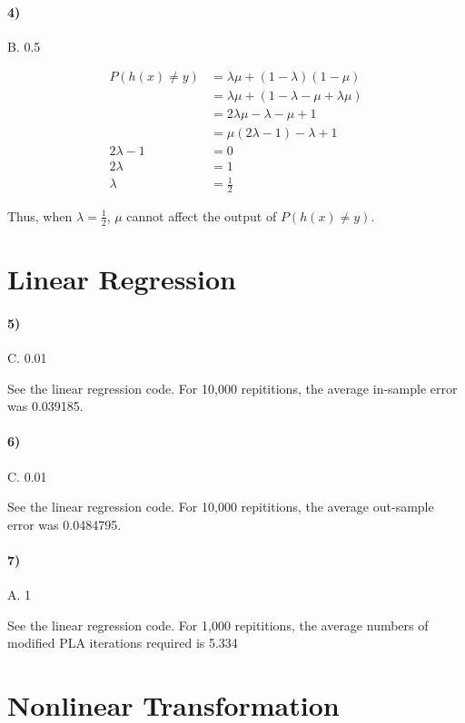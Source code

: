 \documentclass[10pt,letter]{article}
\begin{document}
\paragraph{4)} B. 0.5

	\begin{align*}
	P(h(x) \neq y) &= \lambda \mu + (1 - \lambda)(1 - \mu) \\
	&= \lambda \mu + (1 - \lambda - \mu + \lambda\mu) \\
	&= 2\lambda \mu - \lambda - \mu + 1 \\
	&= \mu (2\lambda -1) - \lambda + 1 \\
	2\lambda -1 &= 0 \\
	2\lambda &= 1 \\
	\lambda &= \frac{1}{2}
	\end{align*}

	Thus, when $\lambda = \frac{1}{2}$, $\mu$ cannot affect the output of $P(h(x) \neq y)$.

\section*{Linear Regression}

\paragraph{5)} C. 0.01

	See the linear regression code. For 10,000 repititions, the average in-sample error was 0.039185. 

\paragraph{6)} C. 0.01

	See the linear regression code. For 10,000 repititions, the average out-sample error was 0.0484795.

\paragraph{7)} A. 1

	See the linear regression code. For 1,000 repititions, the average numbers of modified PLA iterations required is 5.334

\section*{Nonlinear Transformation}
\end{document}
